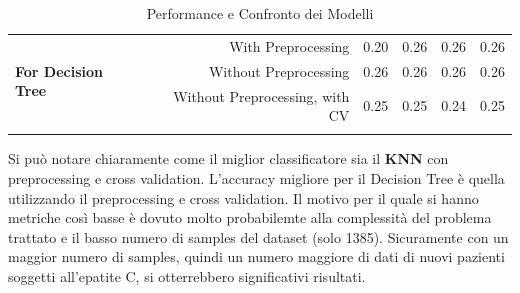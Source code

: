 \begin{table}[ht]
\begin{tabular}{@{}lrcccc@{}}
                                                                  &                                                             &                                            &                                            &                                            &                                            \\ \midrule
\multicolumn{1}{|l|}{\multirow{5}{*}{\textbf{For Decision Tree}}} & \multicolumn{1}{r|}{With Preprocessing}                     & \multicolumn{1}{c|}{0.20}                  & \multicolumn{1}{c|}{0.26}                  & \multicolumn{1}{c|}{0.26}                  & \multicolumn{1}{c|}{0.26}                  \\ \cmidrule(l){2-6} 
\multicolumn{1}{|l|}{}                                            & \multicolumn{1}{r|}{\multirow{3}{*}{Without Preprocessing}} & \multicolumn{1}{c|}{\multirow{3}{*}{0.26}} & \multicolumn{1}{c|}{\multirow{3}{*}{0.26}} & \multicolumn{1}{c|}{\multirow{3}{*}{0.26}} & \multicolumn{1}{c|}{\multirow{3}{*}{0.26}} \\
\multicolumn{1}{|l|}{}                                            & \multicolumn{1}{r|}{}                                       & \multicolumn{1}{c|}{}                      & \multicolumn{1}{c|}{}                      & \multicolumn{1}{c|}{}                      & \multicolumn{1}{c|}{}                      \\
\multicolumn{1}{|l|}{}                                            & \multicolumn{1}{r|}{}                                       & \multicolumn{1}{c|}{}                      & \multicolumn{1}{c|}{}                      & \multicolumn{1}{c|}{}                      & \multicolumn{1}{c|}{}                      \\ \cmidrule(l){2-6} 
\multicolumn{1}{|l|}{}                                            & \multicolumn{1}{r|}{Without Preprocessing, with CV}         & \multicolumn{1}{c|}{0.25}                  & \multicolumn{1}{c|}{0.25}                  & \multicolumn{1}{c|}{0.24}                  & \multicolumn{1}{c|}{0.25}                  \\ \midrule
                                                                  & \multicolumn{1}{l}{}                                        &                                            & \multicolumn{1}{r}{}                       & \multicolumn{1}{l}{}                       & \multicolumn{1}{l}{}                       \\ \bottomrule
\end{tabular}

\caption{Performance e Confronto dei Modelli}
\label{tab:Performance_Modelli}
\end{table}
Si può notare chiaramente come il miglior classificatore sia il \textbf{KNN} con preprocessing e cross validation. 
L'accuracy migliore per il Decision Tree è quella utilizzando il preprocessing e cross validation. 
Il motivo per il quale si hanno metriche così basse è dovuto molto probabilemte alla complessità del problema trattato e il basso numero di samples del dataset (solo 1385). Sicuramente con un maggior numero di samples, quindi un numero maggiore di dati di nuovi pazienti soggetti all'epatite C, si otterrebbero significativi risultati.

